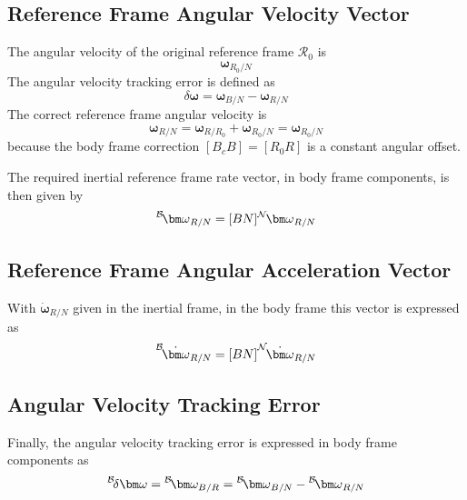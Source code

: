 \subsection{Reference Frame Angular Velocity Vector}
The angular velocity of the original reference frame $\mathcal{R}_{0}$ is
\begin{equation}
	\bm\omega_{R_{0}/N}
\end{equation}
The angular velocity tracking error is defined as
\begin{equation}
	\delta\bm\omega = \bm\omega_{B/N} - \bm\omega_{R/N}
\end{equation}
The correct reference frame angular velocity is
\begin{equation}
	\bm\omega_{R/N} = \bm\omega_{R/R_{0}} + \bm\omega_{R_{0}/N} =  \bm\omega_{R_{0}/N}
\end{equation}
because the body frame correction $[B_{c} B] = [R_{0}R]$ is a constant angular offset.

The required inertial reference frame rate vector, in body frame components, is then given by
\begin{equation}
	\leftexp{B}{\bm\omega}_{R/N} = [BN] \leftexp{N}{\bm\omega}_{R/N}
\end{equation}


\subsection{Reference Frame Angular Acceleration Vector}
With $\dot{\bm \omega}_{R/N}$ given in the inertial frame, in the body frame this vector is expressed as
\begin{equation}
	\leftexp{B}{\dot{\bm\omega}}_{R/N} = [BN] \leftexp{N}{\dot{\bm\omega}}_{R/N}
\end{equation}


\subsection{Angular Velocity Tracking Error}
Finally, the angular velocity tracking error is expressed in body frame components as
\begin{equation}
	\leftexp{B}{\delta\bm\omega} = \leftexp{B}{\bm\omega_{B/R}} = \leftexp{B}{\bm\omega}_{B/N} - \leftexp{B}{\bm\omega}_{R/N}
\end{equation}
